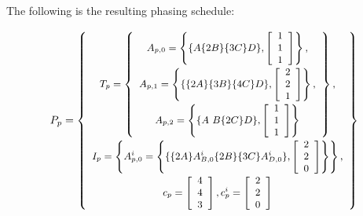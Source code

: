 \noindent The following is the resulting phasing schedule:

\begin{displaymath} \small
P_p = \left\{
\begin{array}{c}
T_p = \left\{
\begin{array}{c}
A_{p,0} = \left\{ \{A\{2B\}\{3C\}D\}, \left[\begin{array}{c} 1 \\ 1 \\ 1 \end{array}\right]\right\}, \\
A_{p,1} = \left\{ \{\{2A\}\{3B\}\{4C\}D\}, \left[\begin{array}{c} 2 \\ 2 \\ 1 \end{array}\right]\right\}, \\
A_{p,2} = \left\{ \{A\ B\{2C\}D\}, \left[\begin{array}{c} 1 \\ 1 \\ 1 \end{array}\right]\right\} \\
\end{array}\right\}, \\
I_p = \left\{ A^i_{p,0} = \left\{
\{\{2A\}A^i_{B,0}\{2B\}\{3C\}A^i_{D,0}\}, \left[\begin{array}{c} 2  \\2 \\ 0 \\
\end{array}\right]\right\}
\right\}, \\
c_p = \left[ \begin{array}{c} 4 \\ 4 \\ 3 \end{array} \right],
c^i_p = \left[ \begin{array}{c} 2 \\ 2 \\ 0 \end{array} \right]
\end{array}
\right\}
\end{displaymath}

\subsubsection{\splitjoin}

